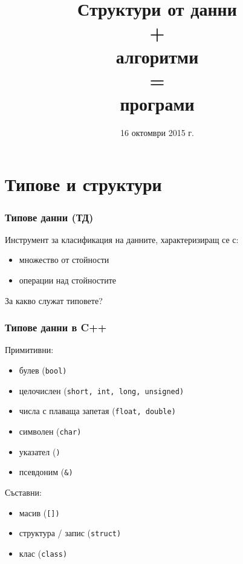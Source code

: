 \documentclass{beamer}
\title[СД+А=П]{Структури от данни\\+\\алгоритми\\=\\програми}
\date{16 октомври 2015 г.}
\begin{document}
\begin{frame}
  \titlepage
\end{frame}

\section{Типове и структури}

\begin{frame}
  \frametitle{Типове данни (ТД)}

  Инструмент за класификация на данните, характеризиращ се с:
  \begin{itemize}
  \item множество от стойности
  \item операции над стойностите
  \end{itemize}
  \vspace{1em}

  \pause

  \alert{За какво служат типовете?}

\end{frame}

\begin{frame}
  \frametitle{Типове данни в C++}

  Примитивни:
  \begin{itemize}
  \item булев (\tt{bool})
  \item целочислен (\tt{short}, \tt{int}, \tt{long}, \tt{unsigned})
  \item числа с плаваща запетая (\tt{float}, \tt{double})
  \item символен (\tt{char})
  \item указател (\tt*)
  \item псевдоним (\tt\&)
  \end{itemize}

  Съставни:
  \begin{itemize}
  \item масив (\tt{[]})
  \item структура / запис (\tt{struct})
  \item клас (\tt{class})
  \end{itemize}
\end{frame}
\end{document}

